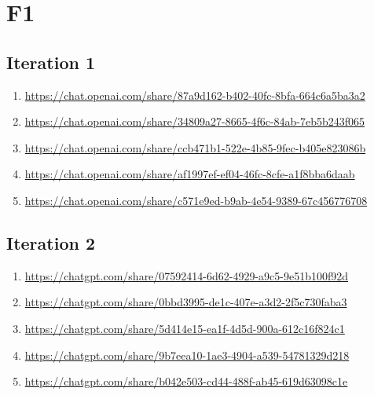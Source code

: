 \section{F1\label{F1}}

\subsection{Iteration 1\label{F1-1}}

\begin{enumerate}
    \item \href{https://chat.openai.com/share/87a9d162-b402-40fc-8bfa-664c6a5ba3a2}{https://chat.openai.com/share/87a9d162-b402-40fc-8bfa-664c6a5ba3a2}
    \item \href{https://chat.openai.com/share/34809a27-8665-4f6c-84ab-7eb5b243f065}{https://chat.openai.com/share/34809a27-8665-4f6c-84ab-7eb5b243f065}
    \item \href{https://chat.openai.com/share/ccb471b1-522e-4b85-9fec-b405e823086b}{https://chat.openai.com/share/ccb471b1-522e-4b85-9fec-b405e823086b}
    \item \href{https://chat.openai.com/share/af1997ef-ef04-46fc-8cfe-a1f8bba6daab}{https://chat.openai.com/share/af1997ef-ef04-46fc-8cfe-a1f8bba6daab}
    \item \href{https://chat.openai.com/share/c571e9ed-b9ab-4e54-9389-67c456776708}{https://chat.openai.com/share/c571e9ed-b9ab-4e54-9389-67c456776708}
\end{enumerate}

\subsection{Iteration 2}

\begin{enumerate}
    \item \href{https://chatgpt.com/share/07592414-6d62-4929-a9c5-9e51b100f92d}{https://chatgpt.com/share/07592414-6d62-4929-a9c5-9e51b100f92d}
    \item \href{https://chatgpt.com/share/0bbd3995-de1c-407e-a3d2-2f5c730faba3}{https://chatgpt.com/share/0bbd3995-de1c-407e-a3d2-2f5c730faba3}
    \item \href{https://chatgpt.com/share/5d414e15-ea1f-4d5d-900a-612c16f824c1}{https://chatgpt.com/share/5d414e15-ea1f-4d5d-900a-612c16f824c1}
    \item \href{https://chatgpt.com/share/9b7eea10-1ae3-4904-a539-54781329d218}{https://chatgpt.com/share/9b7eea10-1ae3-4904-a539-54781329d218}
    \item \href{https://chatgpt.com/share/b042e503-cd44-488f-ab45-619d63098c1e}{https://chatgpt.com/share/b042e503-cd44-488f-ab45-619d63098c1e}
\end{enumerate}

